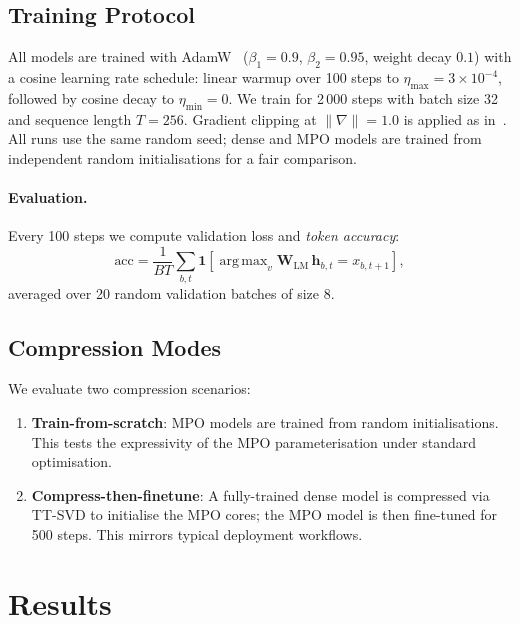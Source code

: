 \documentclass[11pt,a4paper]{article}
\newcommand{\mpomat}[1]{\mathbf{#1}}
\DeclareMathOperator*{\argmax}{arg\,max}
\theoremstyle{definition}
\begin{document}
\subsection{Training Protocol}

All models are trained with AdamW~\citep{loshchilov2019decoupled} ($\beta_1 = 0.9$, $\beta_2 = 0.95$, weight decay $0.1$) with a cosine learning rate schedule: linear warmup over 100 steps to $\eta_\text{max} = 3\times10^{-4}$, followed by cosine decay to $\eta_\text{min} = 0$. We train for 2\,000 steps with batch size 32 and sequence length $T = 256$. Gradient clipping at $\|\nabla\| = 1.0$ is applied as in~\citet{osborne2024picogpt}. All runs use the same random seed; dense and MPO models are trained from independent random initialisations for a fair comparison.

\paragraph{Evaluation.}
Every 100 steps we compute validation loss and \emph{token accuracy}:
\begin{equation}
  \text{acc} = \frac{1}{BT}\sum_{b,t} \mathbf{1}\!\left[\argmax_v \mpomat{W}_\text{LM}\,\bm{h}_{b,t} = x_{b,t+1}\right],
\end{equation}
averaged over 20 random validation batches of size 8.

\subsection{Compression Modes}

We evaluate two compression scenarios:
\begin{enumerate}[itemsep=2pt]
  \item \textbf{Train-from-scratch}: MPO models are trained from random initialisations. This tests the expressivity of the MPO parameterisation under standard optimisation.
  \item \textbf{Compress-then-finetune}: A fully-trained dense model is compressed via TT-SVD to initialise the MPO cores; the MPO model is then fine-tuned for 500 steps. This mirrors typical deployment workflows.
\end{enumerate}


\section{Results}
\end{document}
